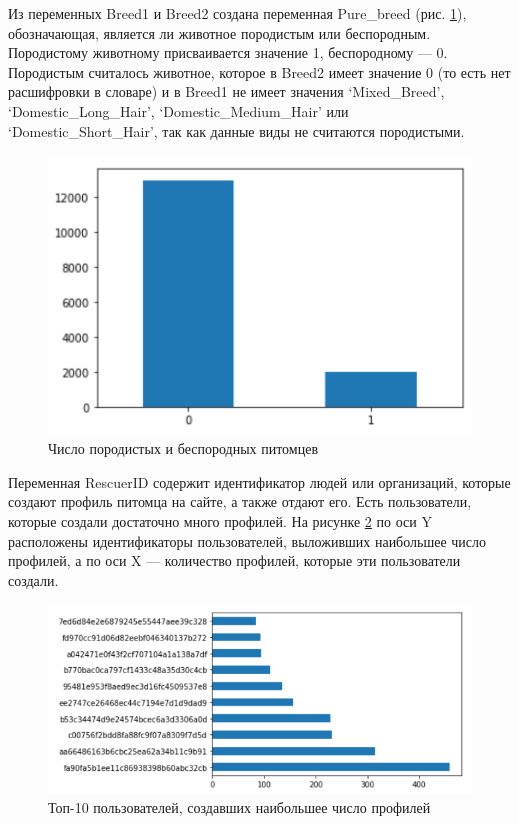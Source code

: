 \documentclass[14pt]{mmcs_article}
\begin{document}
Из переменных Breed1 и Breed2 создана переменная Pure\_breed (рис. \ref{analyse:purebreed}), обозначающая, является ли животное породистым или беспородным. Породистому животному присваивается значение 1, беспородному --- 0. Породистым считалось животное, которое в Breed2 имеет значение 0 (то есть нет расшифровки в словаре) и в Breed1 не имеет значения `Mixed\_Breed', `Domestic\_Long\_Hair', `Domestic\_Medium\_Hair' или \\ `Domestic\_Short\_Hair', так как данные виды не считаются породистыми.

\begin{figure}[H]
	\centering
	\includegraphics[scale=0.9]{purebreed.png}
	\caption{Число породистых и беспородных питомцев}\label{analyse:purebreed}
\end{figure}

Переменная RescuerID содержит идентификатор людей или организаций, которые создают профиль питомца на сайте, а также отдают его. Есть пользователи, которые создали достаточно много профилей. На рисунке \ref{analyse:toprescuer} по оси Y расположены идентификаторы пользователей, выложивших наибольшее число профилей, а по оси X --- количество профилей, которые эти пользователи создали.

\begin{figure}[H]
	\centering
	\includegraphics[scale=1]{toprescuer.png}
	\caption{Топ-10 пользователей, создавших наибольшее число профилей}\label{analyse:toprescuer}
\end{figure}
\end{document}
